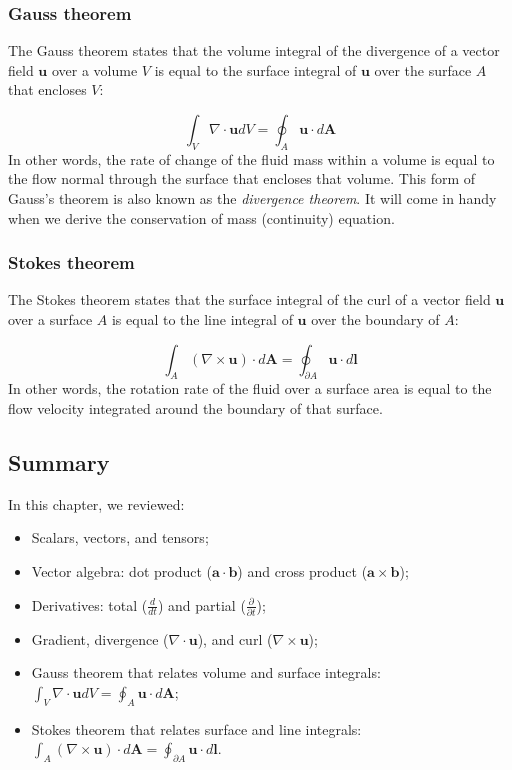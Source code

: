 \documentclass[12pt]{article}
\numberwithin{equation}{section}
\numberwithin{figure}{section}
\numberwithin{table}{section}
\begin{document}
\subsubsection{Gauss theorem}

The Gauss theorem states that the volume integral of the
divergence of a vector field $\mathbf{u}$ over a volume $V$ is equal to the
surface integral of $\mathbf{u}$ over the surface $A$ that encloses $V$:

\begin{equation}
  \label{eq:divergence_theorem}
  \int_V \nabla \cdot \mathbf{u} dV = \oint_A \mathbf{u} \cdot d\mathbf{A}
\end{equation}
In other words, the rate of change of the fluid mass within a volume is equal to
the flow normal through the surface that encloses that volume.
This form of Gauss's theorem is also known as the
\textit{divergence theorem}.
It will come in handy when we derive the conservation of mass (continuity)
equation.

\subsubsection{Stokes theorem}

The Stokes theorem states that the surface integral of the curl of a
vector field $\mathbf{u}$ over a surface $A$ is equal to the line integral of
$\mathbf{u}$ over the boundary of $A$:

\begin{equation}
  \int_A (\nabla \times \mathbf{u}) \cdot d\mathbf{A} = \oint_{\partial A} \mathbf{u} \cdot d\mathbf{l}
\end{equation}
In other words, the rotation rate of the fluid over a surface area is equal to
the flow velocity integrated around the boundary of that surface.

\subsection*{Summary}

In this chapter, we reviewed:

\begin{itemize}
  \item Scalars, vectors, and tensors;
  \item Vector algebra: dot product ($\mathbf{a} \cdot \mathbf{b}$) and cross
  product ($\mathbf{a} \times \mathbf{b}$);
  \item Derivatives: total ($\frac{d}{dt}$) and partial ($\frac{\partial}{\partial t}$);
  \item Gradient, divergence ($\nabla \cdot \mathbf{u}$), and curl ($\nabla \times \mathbf{u}$);
  \item Gauss theorem that relates volume and surface integrals:
  $\int_V \nabla \cdot \mathbf{u} dV = \oint_A \mathbf{u} \cdot d\mathbf{A}$;
  \item Stokes theorem that relates surface and line integrals:
  $\int_A (\nabla \times \mathbf{u}) \cdot d\mathbf{A} = \oint_{\partial A} \mathbf{u} \cdot d\mathbf{l}$.
\end{itemize}
\end{document}
